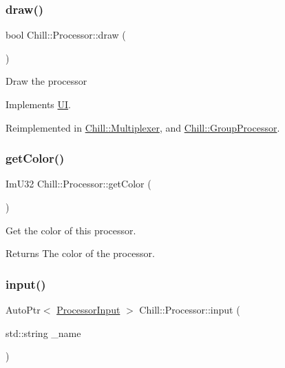 \subsubsection{\texorpdfstring{draw()}{draw()}}
{\footnotesize\ttfamily bool Chill\+::\+Processor\+::draw (\begin{DoxyParamCaption}{ }\end{DoxyParamCaption})\hspace{0.3cm}{\ttfamily [virtual]}}

Draw the processor 

Implements \mbox{\hyperlink{class_u_i_a5025b88e26f21852c0cd2e4b42675c50}{UI}}.



Reimplemented in \mbox{\hyperlink{class_chill_1_1_multiplexer_aac8cf52a617091ffedaee970b5550270}{Chill\+::\+Multiplexer}}, and \mbox{\hyperlink{class_chill_1_1_group_processor_a6c3eadfcb171c48a2d76bebefd153fcb}{Chill\+::\+Group\+Processor}}.

\mbox{\label{class_chill_1_1_processor_a4ee8538c5b95c44cd04224efd86f94bf}} 
\subsubsection{\texorpdfstring{get\+Color()}{getColor()}}
{\footnotesize\ttfamily Im\+U32 Chill\+::\+Processor\+::get\+Color (\begin{DoxyParamCaption}{ }\end{DoxyParamCaption})\hspace{0.3cm}{\ttfamily [inline]}}

Get the color of this processor. \begin{DoxyReturn}{Returns}
The color of the processor. 
\end{DoxyReturn}
\mbox{\label{class_chill_1_1_processor_af7e4fd8473b311ac572825193331d1e6}} 
\subsubsection{\texorpdfstring{input()}{input()}}
{\footnotesize\ttfamily Auto\+Ptr$<$ \mbox{\hyperlink{class_chill_1_1_processor_input}{Processor\+Input}} $>$ Chill\+::\+Processor\+::input (\begin{DoxyParamCaption}\item[{std\+::string}]{\+\_\+name }\end{DoxyParamCaption})}


